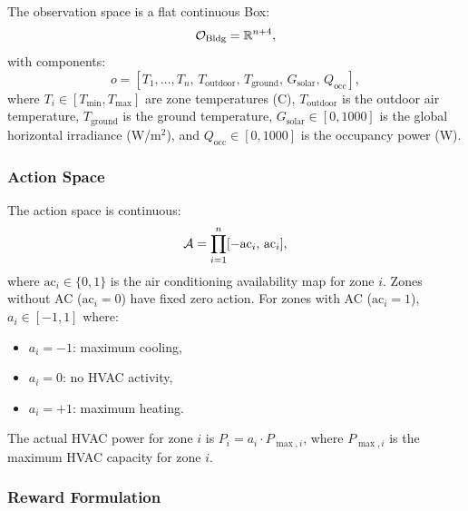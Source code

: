 The observation space is a flat continuous Box:
\begin{equation}
    \mathcal{O}_{\text{Bldg}} = \mathbb{R}^{n+4},
\end{equation}
with components:
\begin{equation}
    o = [T_1, \ldots, T_n, \, T_{\text{outdoor}}, \, T_{\text{ground}}, \, G_{\text{solar}}, \, Q_{\text{occ}}],
    \label{eq:building_obs}
\end{equation}
where $T_i \in [T_{\min}, T_{\max}]$ are zone temperatures (\degree C), $T_{\text{outdoor}}$ is the outdoor air temperature, $T_{\text{ground}}$ is the ground temperature, $G_{\text{solar}} \in [0, 1000]$ is the global horizontal irradiance (W/m$^2$), and $Q_{\text{occ}} \in [0, 1000]$ is the occupancy power (W).

\subsubsection{Action Space}

The action space is continuous:
\begin{equation}
    \mathcal{A} = \prod_{i=1}^{n} [-\text{ac}_i, \, \text{ac}_i],
\end{equation}
where $\text{ac}_i \in \{0,1\}$ is the air conditioning availability map for zone $i$. Zones without AC ($\text{ac}_i = 0$) have fixed zero action. For zones with AC ($\text{ac}_i = 1$), $a_i \in [-1, 1]$ where:
\begin{itemize}
    \item $a_i = -1$: maximum cooling,
    \item $a_i = 0$: no HVAC activity,
    \item $a_i = +1$: maximum heating.
\end{itemize}
The actual HVAC power for zone $i$ is $P_i = a_i \cdot P_{\max,i}$, where $P_{\max,i}$ is the maximum HVAC capacity for zone $i$.

\subsubsection{Reward Formulation}


